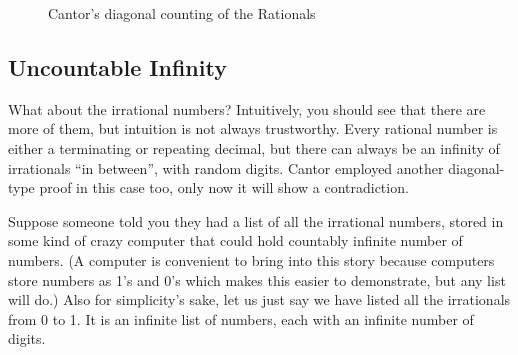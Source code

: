 \begin{figure}[h]
\begin{centering}
\caption{Cantor's diagonal counting of the Rationals}
\end{centering}
\end{figure}

\subsection{Uncountable Infinity}
What about the irrational numbers?  Intuitively, you should see that there are more of
them, but intuition is not always trustworthy.  Every rational number is either a 
terminating or repeating decimal, but there can always be an infinity of irrationals
``in between'', with random digits.  Cantor employed another diagonal-type proof
in this case too, only now it will show a contradiction.

Suppose someone told you they had a list of all the irrational numbers, stored in 
some kind of crazy computer that could hold countably infinite number of numbers.
(A computer is convenient to bring into this story because computers store numbers
as 1's and 0's which makes this easier to demonstrate, but any list will do.)  Also
for simplicity's sake, let us just say we have listed all the irrationals from 0 to 1.
It is an infinite list of numbers, each with an infinite number of digits.


